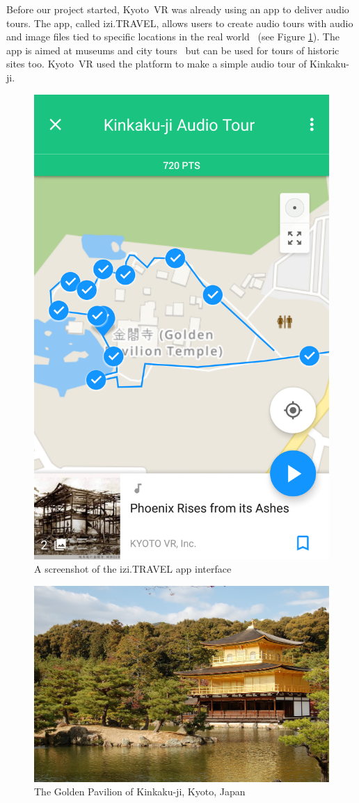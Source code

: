 \documentclass[a4paper, 10pt, american, titlepage]{article}
\begin{document}
Before our project started, Kyoto~VR was already using an app to deliver audio
tours. The app, called izi.TRAVEL, allows users to create audio tours with
audio and image files tied to specific locations in the real
world~\autocite{izitravel2015} (see Figure \ref{fig:iziTravel}). The app is
aimed at museums and city tours~\autocite{izitravel} but can be used for tours
of historic sites too.  Kyoto~VR used the platform to make a simple audio tour
of Kinkaku-ji.

\begin{figure}[h]
	\centering
	\includegraphics[width=.5\textwidth]{izi-travel.png}
	\caption{A screenshot of the izi.TRAVEL app interface}
	\label{fig:iziTravel}
\end{figure}

\begin{figure}[h]
	\centering
	\includegraphics[width=\textwidth]{kinkakuji.jpg}
	\caption[The Golden Pavilion of Kinkaku-ji, Kyoto, Japan]{The Golden
		Pavilion of Kinkaku-ji, Kyoto, Japan~\autocite{davidson2005}}
	\label{fig:kinkakuji}
\end{figure}
\end{document}
